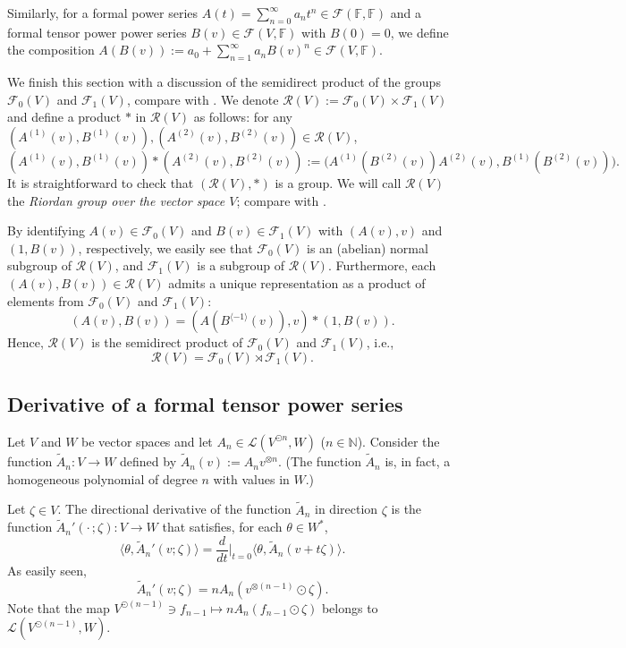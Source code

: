 \documentclass[12pt]{article}
\theoremstyle{remark}
\theoremstyle{remark}
\theoremstyle{remark}
\begin{document}
Similarly, for a formal power series $A(t)=\sum_{n=0}^\infty a_nt^n\in\mathcal F(\mathbb F,\mathbb F)$
and a formal tensor power power series $B(v)\in\mathcal F(V,\mathbb F)$ with $B(0)=0$, we define the composition 
$A(B(v)):=a_0+\sum_{n=1}^\infty a_nB(v)^n\in\mathcal F(V,\mathbb F). $ 

We finish this section with a discussion of the semidirect product of the groups $\mathcal F_0(V)$ and $\mathcal F_1(V)$, compare with \cite[Section~3.4]{FLO}. We denote $\mathcal R(V):=\mathcal F_{0}(V)\times \mathcal F_{1}(V)$ and define a product $\ast$ in $\mathcal R(V)$ as follows: for any $(A^{(1)}(v),B^{(1)}(v)),(A^{(2)}(v),B^{(2)}(v))\in \mathcal R(V)$,
\begin{equation}\label{bvfrsxrea4qw}(A^{(1)}(v),B^{(1)}(v))\ast(A^{(2)}(v),B^{(2)}(v)):=\big(A^{(1)}(B^{(2)}(v))A^{(2)}(v), B^{(1)}( B^{(2)}(v))\big).\end{equation}
It is straightforward to check that $(\mathcal R(V),\ast)$ is a group. We will call $\mathcal R(V)$ the {\it Riordan group over the vector space $V$}; compare with \cite[Section~7.3]{ShapiroBook}.


By identifying $A(v)\in\mathcal F_0(V)$ and $B(v)\in\mathcal F_1(V)$ with $(A(v), v)$ and $(1, B(v))$, respectively, we easily see that
 $\mathcal F_0(V)$ is an (abelian) normal subgroup of $\mathcal R(V)$, and $\mathcal F_1(V)$ is a subgroup of $\mathcal R(V)$. Furthermore, each $(A(v), B(v))\in \mathcal R(V)$ admits a unique representation as a product of elements from $\mathcal F_0(V)$ and $\mathcal F_1(V)$:
 $$(A(v), B(v))=(A(B^{\langle-1\rangle}(v)), v)\ast(1, B(v)).$$
 Hence, $\mathcal R(V)$ is the semidirect product of $\mathcal F_0(V)$ and $\mathcal F_1(V)$, i.e., 
 \begin{equation}\label{cxdsresresuy}\mathcal R(V)=\mathcal F_0(V) \rtimes\mathcal F_1(V).
 \end{equation}
 
 \subsection{Derivative of a formal tensor power series}

Let $V$ and $W$ be vector spaces and let $A_n\in\mathcal L(V^{\odot n},W)$ ($n\in\mathbb N$). Consider the function
$\tilde A_n:V\to W$ defined by $\tilde A_n(v):=A_nv^{\otimes n}$. (The function $\tilde A_n$ is, in fact, a homogeneous polynomial of degree $n$ with values in $W$.)

Let $\zeta\in V$. The  directional derivative of the function $\tilde A_n$ in direction $\zeta$ is the function $\tilde A_n'(\cdot\,;\zeta):V\to W$ that satisfies, for each $\theta\in W^*$,
$$\langle \theta, \tilde A_n'(v;\zeta)\rangle=\frac d{dt}\Big|_{t=0}\langle \theta, \tilde A_n(v+t\zeta)\rangle. $$
As easily seen, 
\begin{equation}\label{dxzra4ywy}\tilde A_n'(v;\zeta)=nA_n(v^{\otimes(n-1)}\odot \zeta).\end{equation}
Note that the map $V^{\odot (n-1)}\ni f_{n-1}\mapsto nA_n(f_{n-1}\odot \zeta)$ belongs to $\mathcal L(V^{\odot(n-1)},W)$.
\end{document}
